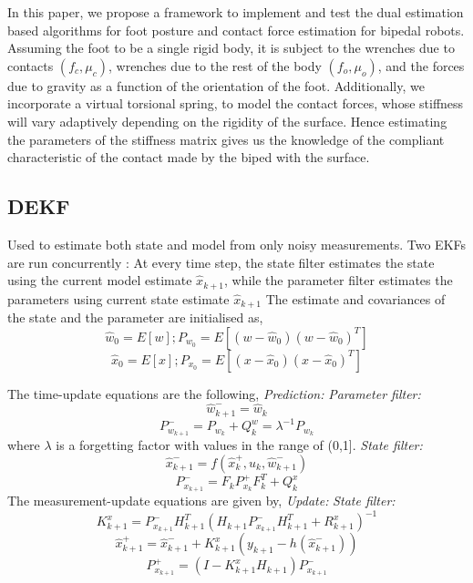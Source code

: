 \documentclass[letterpaper, 10pt, conference]{ieeeconf}      %
\begin{document}
In this paper, we propose a framework to implement and test the dual estimation based algorithms for foot posture and contact force estimation for bipedal robots. Assuming the foot to be a single rigid body, it is subject to the wrenches due to contacts $(f_c,\mu_c)$, wrenches due to the rest of the body $(f_o,\mu_o)$, and the forces due to gravity as a function of the orientation of the foot. Additionally, we incorporate a virtual torsional spring, to model the contact forces, whose stiffness will vary adaptively depending on the rigidity of the surface. Hence estimating the parameters of the stiffness matrix gives us the knowledge of the compliant characteristic of the contact made by the biped with the surface.


\subsection{DEKF}

Used to estimate both state and model  from only noisy measurements. Two EKFs are run concurrently : At every time step, the state filter estimates the state using the current model estimate $\hat{x}_{k+1}$, while the parameter filter estimates the parameters using current state estimate $\hat{x}_{k+1}$
The estimate and covariances of the state and the parameter are initialised as,
	$$\hat{w}_{0} = E[w] ; 	P_{w_{0}} = E[(w - \hat{w}_{0})(w - \hat{w}_{0})^{T}]$$
	$$\hat{x}_{0} = E[x] ; 	P_{x_{0}} = E[(x - \hat{x}_{0})(x - \hat{x}_{0})^{T}]$$
	
The time-update equations are the following,\linebreak
\textit{	Prediction:} 
\linebreak
\textit{Parameter filter:}
  $$\hat{w}_{k+1}^{-} = \hat{w}_{k}$$
  $$P_{w_{k+1}}^{-} = P_{w_{k}} + Q_{k}^{w} = \lambda^{-1}P_{w_{k}}$$
  where $\lambda$ is a forgetting factor with values in the range of (0,1].
\linebreak
\textit{State filter:}
  $$\hat{x}_{k+1}^{-} = f(\hat{x}_{k}^{+},u_{k},\hat{w}_{k+1}^{-})$$
$$P_{x_{k+1}}^{-} = F_{k}P_{x_{k}}^{+}F_{k}^{T} + Q_{k}^{x} $$
\linebreak
The measurement-update equations are given by,
\linebreak
\textit{	Update:} 
\linebreak
\textit{State filter:}
$$K^{x}_{k+1} = P_{x_{k+1}}^{-}H_{k+1}^{T}(H_{k+1}P_{x_{k+1}}^{-}H_{k+1}^{T} + R_{k+1}^{x})^{-1} $$
$$\hat{x}_{k+1}^{+} = \hat{x}_{k+1}^{-} + K^{x}_{k+1}(y_{k+1} - h(\hat{x}_{k+1}^{-})) $$
$$P_{x_{k+1}}^{+} = (I-K^{x}_{k+1}H_{k+1})P_{x_{k+1}}^{-}$$
\end{document}

